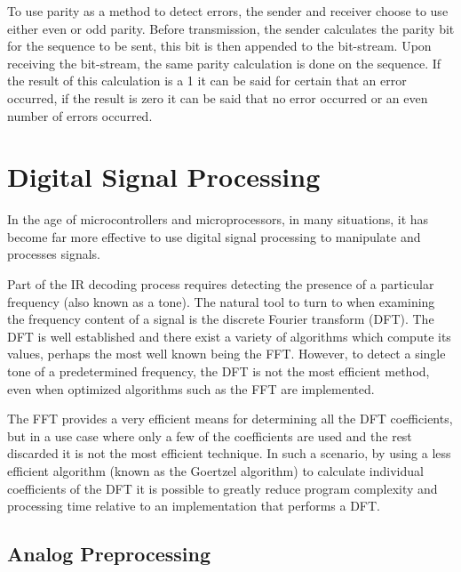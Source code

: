 To use parity as a method to detect errors, the sender and receiver choose to use either even or odd parity. Before transmission, the sender calculates the parity bit for the sequence to be sent, this bit is then appended to the bit-stream. Upon receiving the bit-stream, the same parity calculation is done on the sequence. If the result of this calculation is a 1 it can be said for certain that an error occurred, if the result is zero it can be said that no error occurred or an even number of errors occurred.






\section{Digital Signal Processing}
In the age of microcontrollers and microprocessors, in many situations, it has become far more effective to use digital signal processing to manipulate and processes signals.

Part of the IR decoding process requires detecting the presence of a particular frequency (also known as a tone). The natural tool to turn to when examining the frequency content of a signal is the discrete Fourier transform (DFT). The DFT is well established and there exist a variety of algorithms which compute its values, perhaps the most well known being the FFT. However, to detect a single tone of a predetermined frequency, the DFT is not the most efficient method, even when optimized algorithms such as the FFT are implemented.

The FFT provides a very efficient means for determining all the DFT coefficients, but in a use case where only a few of the coefficients are used and the rest discarded it is not the most efficient technique. In such a scenario, by using a less efficient algorithm (known as the Goertzel algorithm) to calculate individual coefficients of the DFT it is possible to greatly reduce program complexity and processing time relative to an implementation that performs a DFT.


\subsection{Analog Preprocessing}

